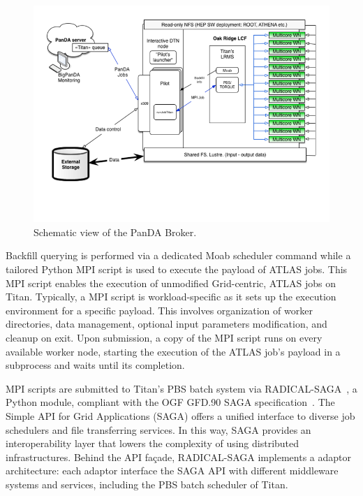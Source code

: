 \begin{figure}
  \begin{center}
    \includegraphics[width=\columnwidth]{figures/PanDA_setup_at_OLCF.png}
    \caption{Schematic view of the PanDA Broker.}
  \end{center}
\label{fig:panda_broker}
\end{figure}

Backfill querying is performed via a dedicated Moab scheduler command while a
tailored Python MPI script is used to execute the payload of ATLAS jobs. This
MPI script enables the execution of unmodified Grid-centric, ATLAS jobs on
Titan. Typically, a MPI script is workload-specific as it sets up the execution
environment for a specific payload. This involves organization of worker
directories, data management, optional input parameters modification, and
cleanup on exit. Upon submission, a copy of the MPI script runs on every
available worker node,
starting the execution of the ATLAS job's payload in a subprocess and waits
until its completion.

MPI scripts are submitted to Titan's PBS batch system via
RADICAL-SAGA~\cite{radical-saga_url}, a Python module, compliant with the OGF
GFD.90 SAGA specification~\cite{goodale2008simple}. The Simple API for Grid
Applications (SAGA) offers a unified interface to diverse job schedulers and
file transferring services. In this way, SAGA provides an interoperability layer
that lowers the complexity of using distributed infrastructures. Behind the API
façade, RADICAL-SAGA implements a adaptor architecture: each adaptor interface
the SAGA API with different middleware systems and services, including the PBS
batch scheduler of Titan.

